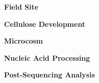 \textbf{Field Site}

\textbf{Cellulose Development}

\textbf{Microcosm}

\textbf{Nucleic Acid Processing}

\textbf{Post-Sequencing Analysis}